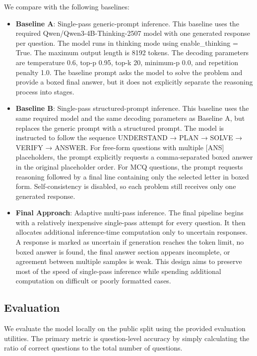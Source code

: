 \documentclass{article}
\begin{document}
We compare with the following baselines:
\begin{itemize}
    \item \textbf{Baseline A}: Single-pass generic-prompt inference. This baseline uses the required Qwen/Qwen3-4B-Thinking-2507 \cite{qwen3} model with one generated response per question. The model runs in thinking mode using enable\_thinking = True. The maximum output length is 8192 tokens. The decoding parameters are temperature 0.6, top-p 0.95, top-k 20, minimum-p 0.0, and repetition penalty 1.0. The baseline prompt asks the model to solve the problem and provide a boxed final answer, but it does not explicitly separate the reasoning process into stages.
    \item \textbf{Baseline B}: Single-pass structured-prompt inference. This baseline uses the same required model and the same decoding parameters as Baseline A, but replaces the generic prompt with a structured prompt. The model is instructed to follow the sequence UNDERSTAND → PLAN → SOLVE → VERIFY → ANSWER. For free-form questions with multiple [ANS] placeholders, the prompt explicitly requests a comma-separated boxed answer in the original placeholder order. For MCQ questions, the prompt requests reasoning followed by a final line containing only the selected letter in boxed form. Self-consistency is disabled, so each problem still receives only one generated response.
    \item \textbf{Final Approach}: Adaptive multi-pass inference. The final pipeline begins with a relatively inexpensive single-pass attempt for every question. It then allocates additional inference-time computation only to uncertain responses. A response is marked as uncertain if generation reaches the token limit, no boxed answer is found, the final answer section appears incomplete, or agreement between multiple samples is weak. This design aims to preserve most of the speed of single-pass inference while spending additional computation on difficult or poorly formatted cases.
\end{itemize}
% 

\subsection{Evaluation}
\label{sec:evaluation}
We evaluate the model locally on the public split using the provided evaluation utilities. The primary metric is question-level accuracy by simply calculating the ratio of correct questions to the total number of questions. 
\end{document}
